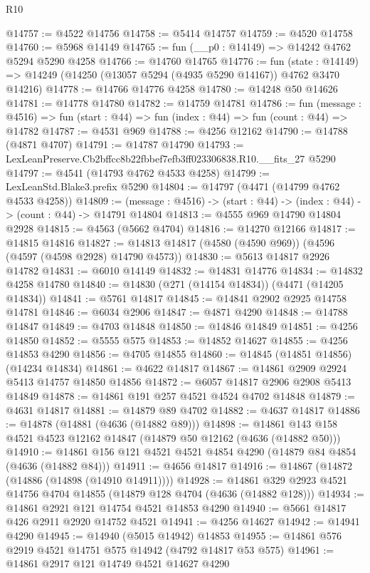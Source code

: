 \begin{lexlean}{R10}
\begin{coremodule}
@14757 := @4522 @14756
@14758 := @5414 @14757
@14759 := @4520 @14758
@14760 := @5968 @14149
@14765 := fun (__p0 : @14149) => @14242 @4762 @5294 @5290 @4258
@14766 := @14760 @14765
@14776 := fun (state : @14149) =>
  @14249 (@14250 (@13057 @5294 (@4935 @5290 @14167)) @4762 @3470 @14216)
@14778 := @14766 @14776 @4258
@14780 := @14248 @50 @14626
@14781 := @14778 @14780
@14782 := @14759 @14781
@14786 := fun (message : @4516) =>
  fun (start : @44) => fun (index : @44) => fun (count : @44) => @14782
@14787 := @4531 @969
@14788 := @4256 @12162
@14790 := @14788 (@4871 @4707)
@14791 := @14787 @14790
@14793 := LexLeanPreserve.Cb2bffcc8b22fbbef7efb3ff023306838.R10.__fits_27 @5290
@14797 := @4541 (@14793 @4762 @4533 @4258)
@14799 := LexLeanStd.Blake3.prefix @5290
@14804 := @14797 (@4471 (@14799 @4762 @4533 @4258))
@14809 := (message : @4516) -> (start : @44) -> (index : @44) -> (count : @44) -> @14791 @14804
@14813 := @4555 @969 @14790 @14804 @2928
@14815 := @4563 (@5662 @4704)
@14816 := @14270 @12166
@14817 := @14815 @14816
@14827 := @14813 @14817 (@4580 (@4590 @969)) (@4596 (@4597 (@4598 @2928) @14790 @4573))
@14830 := @5613 @14817 @2926 @14782
@14831 := @6010 @14149
@14832 := @14831 @14776
@14834 := @14832 @4258 @14780
@14840 := @14830 (@271 (@14154 @14834)) (@4471 (@14205 @14834))
@14841 := @5761 @14817
@14845 := @14841 @2902 @2925 @14758 @14781
@14846 := @6034 @2906
@14847 := @4871 @4290
@14848 := @14788 @14847
@14849 := @4703 @14848
@14850 := @14846 @14849
@14851 := @4256 @14850
@14852 := @5555 @575
@14853 := @14852 @14627
@14855 := @4256 @14853 @4290
@14856 := @4705 @14855
@14860 := @14845 (@14851 @14856) (@14234 @14834)
@14861 := @4622 @14817
@14867 := @14861 @2909 @2924 @5413 @14757 @14850 @14856
@14872 := @6057 @14817 @2906 @2908 @5413 @14849
@14878 := @14861 @191 @257 @4521 @4524 @4702 @14848
@14879 := @4631 @14817
@14881 := @14879 @89 @4702
@14882 := @4637 @14817
@14886 := @14878 (@14881 (@4636 (@14882 @89)))
@14898 := @14861 @143 @158 @4521 @4523 @12162 @14847 (@14879 @50 @12162 (@4636 (@14882 @50)))
@14910 := @14861 @156 @121 @4521 @4521 @4854 @4290 (@14879 @84 @4854 (@4636 (@14882 @84)))
@14911 := @4656 @14817
@14916 := @14867 (@14872 (@14886 (@14898 (@14910 @14911))))
@14928 := @14861 @329 @2923 @4521 @14756 @4704 @14855 (@14879 @128 @4704 (@4636 (@14882 @128)))
@14934 := @14861 @2921 @121 @14754 @4521 @14853 @4290
@14940 := @5661 @14817 @426 @2911 @2920 @14752 @4521
@14941 := @4256 @14627
@14942 := @14941 @4290
@14945 := @14940 (@5015 @14942) @14853
@14955 := @14861 @576 @2919 @4521 @14751 @575 @14942 (@4792 @14817 @53 @575)
@14961 := @14861 @2917 @121 @14749 @4521 @14627 @4290

\end{coremodule}
\end{lexlean}
